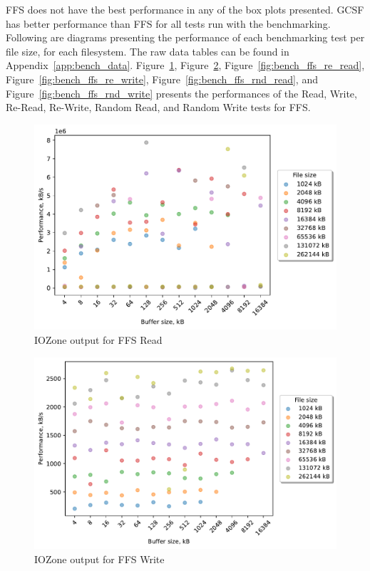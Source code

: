 \FloatBarrier

\gls{FFS} does not have the best performance in any of the box plots presented. \gls{GCSF} has better performance than \gls{FFS} for all tests run with the benchmarking. Following are diagrams presenting the performance of each benchmarking test per file size, for each filesystem. The raw data tables can be found in Appendix~\ref{app:bench_data}. Figure~\ref{fig:bench_ffs_read}, Figure~\ref{fig:bench_ffs_write}, Figure~\ref{fig:bench_ffs_re_read}, Figure~\ref{fig:bench_ffs_re_write}, Figure~\ref{fig:bench_ffs_rnd_read}, and Figure~\ref{fig:bench_ffs_rnd_write} presents the performances of the Read, Write, \mbox{Re-Read}, \mbox{Re-Write}, Random Read, and Random Write tests for \gls{FFS}.

\begin{figure}[!htb]
	\label{fig:bench_ffs_read}
	\begin{center}
		\includegraphics[width=1.0\textwidth]{figures/benchmarking/ffs/Read.pdf}
	\end{center}
	\caption{IOZone output for FFS Read}
\end{figure}

\begin{figure}[!htb]
	\label{fig:bench_ffs_write}
	\begin{center}
		\includegraphics[width=1.0\textwidth]{figures/benchmarking/ffs/Write.pdf}
	\end{center}
	\caption{IOZone output for FFS Write}
\end{figure}

